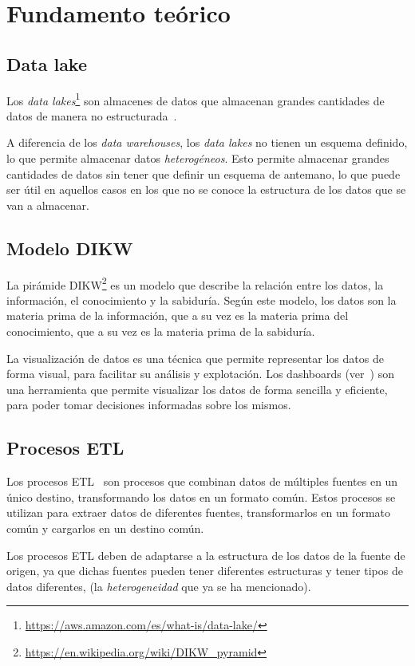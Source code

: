 \chapter{Fundamento teórico}\label{chap:teoria}
\section{Data lake}\label{sec:datalake}
Los \textit{data lakes}\footnote{\url{https://aws.amazon.com/es/what-is/data-lake/}}
son almacenes de datos que almacenan grandes cantidades de datos de manera no
estructurada~\cite{mier2023dashboards}.

A diferencia de los \textit{data warehouses}, los \textit{data lakes} no tienen un
esquema definido, lo que permite almacenar datos \textit{heterogéneos}. Esto permite
almacenar grandes cantidades de datos sin tener que definir un esquema de antemano,
lo que puede ser útil en aquellos casos en los que no se conoce la estructura de los
datos que se van a almacenar.


\section{Modelo DIKW}\label{sec:dikw}
La pirámide DIKW\footnote{\url{https://en.wikipedia.org/wiki/DIKW_pyramid}} es un modelo que
describe la relación entre los datos, la información, el conocimiento y la sabiduría. Según este
modelo, los datos son la materia prima de la información, que a su vez es la materia prima del
conocimiento, que a su vez es la materia prima de la sabiduría.

La visualización de datos es una técnica que permite representar los datos de forma visual, para
facilitar su análisis y explotación. Los dashboards (ver~) son una
herramienta que permite visualizar los datos de forma sencilla y eficiente, para poder tomar
decisiones informadas sobre los mismos.

\section{Procesos ETL}\label{sec:etl}
Los procesos ETL~\cite{mier2023dashboards} son procesos que combinan datos de múltiples
fuentes en un único destino, transformando los datos en un formato común. Estos procesos
se utilizan para extraer datos de diferentes fuentes, transformarlos en un formato común
y cargarlos en un destino común.

Los procesos ETL deben de adaptarse a la estructura de los datos de la fuente de origen,
ya que dichas fuentes pueden tener diferentes estructuras y tener tipos de datos diferentes,
(la \textit{heterogeneidad} que ya se ha mencionado).

